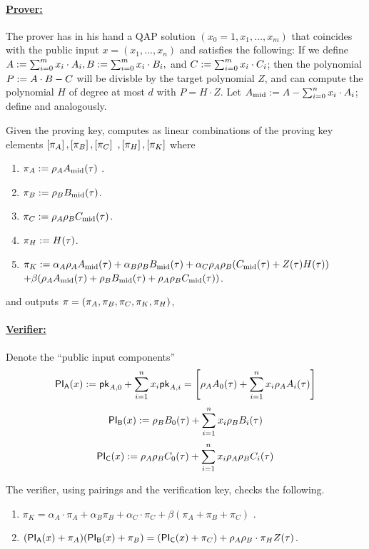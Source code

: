 \documentclass[11pt]{article}
\numberwithin{figure}{section} %
\begin{document}
\paragraph{\underline{Prover:}\\}
The prover has in his hand a QAP solution $(x_0=1,x_1,\ldots,x_m)$ that coincides with the public input $x=(x_1,\ldots,x_n)$ and satisfies the following:
If we define $A:= \sum_{i=0}^m x_i\cdot A_i, B:= \sum_{i=0}^m x_i \cdot B_i,$ and $C:= \sum_{i=0}^m x_i \cdot C_i$;
then the polynomial $P:= A\cdot B - C$ will be divisble by the target polynomial $Z$, and \per can compute the polynomial $H$ of degree at most $d$ with $P=H\cdot Z$. Let $A_{\mathrm{mid}}:= A -\sum_{i=0}^n x_i\cdot A_i$; define \midb and \midc analogously.

Given the proving key, \per computes as linear combinations of the proving key elements $\left[\pi_A\right],\left[\pi_B\right],\left[\pi_C\right]$ $,\left[\pi_H\right],\left[\pi_K\right]$ where 
\begin{enumerate}
\item $\pi_A:= \rho_A A_{\mathrm{mid}}(\tau)$ .
\item $\pi_B:= \rho_B B_{\mathrm{mid}}(\tau)$.
\item $\pi_C:= \rho_A\rho_B C_{\mathrm{mid}}(\tau)$.
\item $\pi_H:= H(\tau)$.
\item $\pi_K:= \alpha_A \rho_AA_{\mathrm{mid}}(\tau) + \alpha_B \rho_BB_{\mathrm{mid}}(\tau) + \alpha_C\rho_A\rho_B(C_{\mathrm{mid}}(\tau)+ Z(\tau)H(\tau))$
$+ \beta(\rho_AA_{\mathrm{mid}}(\tau)+\rho_BB_{\mathrm{mid}}(\tau) + \rho_A\rho_BC_{\mathrm{mid}}(\tau))$.
\end{enumerate}
 and outputs $\pi = (\pi_A,\pi_B,\pi_C,\pi_K,\pi_H)$,
 

\paragraph{\underline{Verifier:}\\}
Denote the ``public input components'' 
\[ \mathsf{PI_A}(x) := \mathsf{pk}_{A,0} + \sum_{i=1}^n x_i \mathsf{pk}_{A,i} = \left[\rho_A A_0(\tau) + \sum_{i=1}^n x_i \rho_A A_i(\tau) \right]\]
\[ \mathsf{PI_B}(x) :=  \rho_B B_0(\tau) + \sum_{i=1}^n x_i \rho_B B_i(\tau) \]
\[ \mathsf{PI_C}(x) := \rho_A\rho_B C_0(\tau) + \sum_{i=1}^n x_i \rho_A\rho_B C_i(\tau) \]

 The verifier, using pairings and the verification key, checks the following.
\begin{enumerate}
\item $\pi_K =     \alpha_A\cdot \pi_A+ \alpha_B\pi_B+\alpha_C\cdot \pi_C+ \beta(\pi_A+\pi_B+\pi_C)$
.
\item $(\mathsf{PI_A}(x)+\pi_A)(\mathsf{PI_B}(x)+\pi_B)= (\mathsf{PI_C}(x)+\pi_C)+\rho_A\rho_B\cdot \pi_H Z(\tau)$.
 \end{enumerate}
\end{document}
